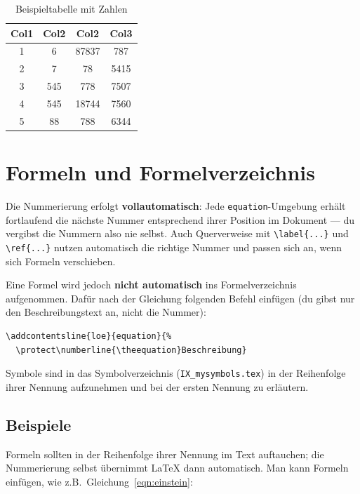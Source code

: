 \begin{table}[ht]
\centering
\setlength{\tabcolsep}{14pt}
\begin{tabular}{||c c c c||} 
\hline
Col1 & Col2 & Col2 & Col3 \\ [0.5ex] 
\hline\hline
1 & 6 & 87837 & 787 \\ 
2 & 7 & 78 & 5415 \\
3 & 545 & 778 & 7507 \\
4 & 545 & 18744 & 7560 \\
5 & 88 & 788 & 6344 \\ [1ex] 
\hline
\end{tabular}
\caption{Beispieltabelle mit Zahlen}
\label{tab: example}
\end{table}

\ifnum{}
  \section{Formeln und Formelverzeichnis}
  Die Nummerierung erfolgt \textbf{vollautomatisch}: Jede \texttt{equation}-Umgebung erhält fortlaufend die nächste Nummer entsprechend ihrer Position im Dokument — du vergibst die Nummern also nie selbst. Auch Querverweise mit \verb|\label{...}| und \verb|\ref{...}| nutzen automatisch die richtige Nummer und passen sich an, wenn sich Formeln verschieben.

  Eine Formel wird jedoch \textbf{nicht automatisch} ins Formelverzeichnis aufgenommen. Dafür nach der Gleichung folgenden Befehl einfügen (du gibst nur den Beschreibungstext an, nicht die Nummer):
  \begin{verbatim}
\addcontentsline{loe}{equation}{%
  \protect\numberline{\theequation}Beschreibung}
  \end{verbatim}

  Symbole sind in das Symbolverzeichnis
  (\texttt{IX\_mysymbols.tex}) in der Reihenfolge ihrer Nennung
  aufzunehmen und bei der ersten Nennung zu erläutern.

  \subsection{Beispiele}
  Formeln sollten in der Reihenfolge ihrer Nennung im Text auftauchen; die Nummerierung selbst übernimmt \LaTeX{} dann automatisch.
  Man kann Formeln einfügen, wie z.B.\ Gleichung~\ref{eqn:einstein}:


